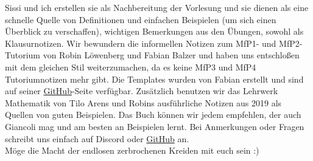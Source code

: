 Sissi und ich erstellen sie als Nachbereitung der Vorlesung und sie dienen als eine schnelle Quelle von Definitionen und einfachen Beispielen (um sich einen Überblick zu verschaffen), wichtigen Bemerkungen aus den Übungen, sowohl als Klausurnotizen. Wir bewundern die informellen Notizen zum MfP1- und MfP2-Tutorium von Robin Löwenberg und Fabian Balzer und haben uns entschloßen mit dem gleichen Stil weiterzumachen, da es keine MfP3 und MfP4 Tutoriumnotizen mehr gibt. Die Templates wurden von Fabian erstellt und sind auf seiner \href{https://github.com/Fabian-Balzer/MfP2-Notizen}{GitHub}-Seite verfügbar. Zusätzlich benutzen wir das Lehrwerk Mathematik von Tilo Arens und Robins ausführliche Notizen aus 2019 als Quellen von guten Beispielen. Das Buch können wir jedem empfehlen, der auch Giancoli mag und am besten an Beispielen lernt. Bei Anmerkungen oder Fragen schreibt uns einfach auf Discord oder \href{https://github.com/luxdragon/MfP3-Notizen}{GitHub} an. \\ 

Möge die Macht der endlosen zerbrochenen Kreiden mit euch sein :)

\cfoot{\pagemark}
